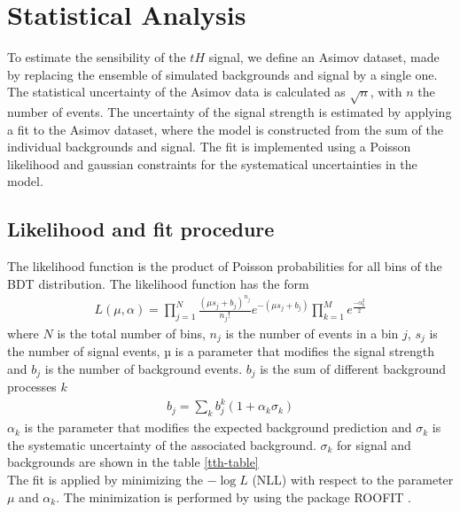 \chapter{Statistical Analysis}
\begin{linenumbers}
To estimate the sensibility of the $tH$ signal, we define an Asimov dataset, made by replacing the ensemble of simulated backgrounds and signal by a single one. The statistical uncertainty of the Asimov data is calculated as $\sqrt{n}$, with $n$ the number of events. The uncertainty of the signal strength is estimated by applying a  fit to the Asimov dataset, where the model
is constructed from the sum of the individual backgrounds and signal. The fit is implemented using a Poisson likelihood and gaussian constraints for the systematical uncertainties in the model.


\section{Likelihood and fit procedure}
The likelihood function is the product of Poisson probabilities for all bins of the BDT distribution. The likelihood function has the form
\begin{align}
L(\mu,\alpha)=\prod_{j=1}^{N}\frac{(\mu s_j +b_j)^{n_j}}{n_j !}e^{-(\mu s_j+b_j)} \prod_{k=1}^M e^{\frac{-\alpha^2_k}{2}}
\end{align}
where $N$ is the total number of bins, $n_j$ is the number of events in a bin $j$,  $s_j$ is the number of signal events, µ is a parameter that modifies the signal strength and  $b_j$ is the number of background events.
$b_j$ is the sum of different background processes $k$
\begin{align}
b_j=\sum_k b_j^k(1+ \alpha_k \sigma_k)
\end{align}
$\alpha_k$ is the parameter that modifies the expected background prediction and $\sigma_k$ is the systematic uncertainty of the associated background. $\sigma_k$ for signal and backgrounds are shown in the table \ref{tth-table} \\

The fit is applied by minimizing the $-\log{L}$ (NLL) with respect to the parameter $\mu$ and $\alpha_k$. The minimization is performed by using the package ROOFIT \cite{roofit}.



\end{linenumbers}
